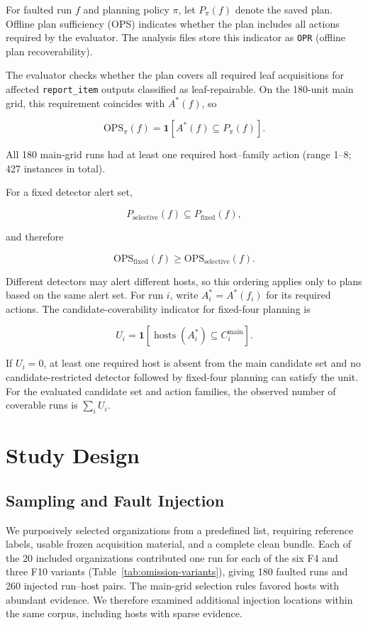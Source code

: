 \documentclass[sn-basic]{sn-jnl}%
\theoremstyle{thmstyleone}%
\theoremstyle{thmstyletwo}%
\theoremstyle{thmstylethree}%
\begin{document}
For faulted run \(f\) and planning policy \(\pi\), let \(P_{\pi}(f)\) denote the saved plan. Offline plan sufficiency (OPS) indicates whether the plan includes all actions required by the evaluator. The analysis files store this indicator as \texttt{OPR} (offline plan recoverability).

The evaluator checks whether the plan covers all required leaf acquisitions for affected \texttt{report\_item} outputs classified as leaf-repairable. On the 180-unit main grid, this requirement coincides with \(A^{*}(f)\), so

\[
\mathrm{OPS}_{\pi}(f)=\mathbf{1}\!\left[A^{*}(f)\subseteq P_{\pi}(f)\right].
\]

All 180 main-grid runs had at least one required host--family action (range 1--8; 427 instances in total).

For a fixed detector alert set,

\[
P_{\mathrm{selective}}(f)\subseteq P_{\mathrm{fixed}}(f),
\]

and therefore

\[
\mathrm{OPS}_{\mathrm{fixed}}(f)\ge\mathrm{OPS}_{\mathrm{selective}}(f).
\]

Different detectors may alert different hosts, so this ordering applies only to plans based on the same alert set. For run \(i\), write \(A_i^{*}=A^{*}(f_i)\) for its required actions. The candidate-coverability indicator for fixed-four planning is

\[
U_i=\mathbf{1}\!\left[\operatorname{hosts}(A_i^{*})\subseteq C_i^{\mathrm{main}}\right].
\]

If \(U_i=0\), at least one required host is absent from the main candidate set and no candidate-restricted detector followed by fixed-four planning can satisfy the unit. For the evaluated candidate set and action families, the observed number of coverable runs is \(\sum_i U_i\).

\section{Study Design}\label{sec:study-design}

\subsection{Sampling and Fault Injection}\label{sec:main-sample}

We purposively selected organizations from a predefined list, requiring reference labels, usable frozen acquisition material, and a complete clean bundle. Each of the 20 included organizations contributed one run for each of the six F4 and three F10 variants (Table~\ref{tab:omission-variants}), giving 180 faulted runs and 260 injected run--host pairs. The main-grid selection rules favored hosts with abundant evidence. We therefore examined additional injection locations within the same corpus, including hosts with sparse evidence.
\end{document}
